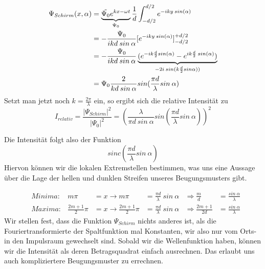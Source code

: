 \documentclass[]{article}
\begin{document}
\begin{align}%
	\Psi_{Schirm}(x,\alpha)&=\underbrace{\Tilde{\Psi_{0}}e^{kx-\omega t}}_{\Psi_{0}}\frac{1}{d}\int_{-d/2}^{d/2} e^{-iky\: sin(\alpha)}  \\ 
	&=-\frac{\Psi_{0}}{ikd \: sin \: \alpha} [e^{-iky \: sin(\alpha)}]^{+d/2}_{-d/2} \\
	&=-\frac{\Psi_{0}}{ikd \: sin \: \alpha} \underbrace{(e^{-ik\frac{d}{2}sin(\alpha)}-e^{ik\frac{d}{2}\:sin(\alpha)})}_{-2i\: sin(k\frac{d}{2}sin \alpha))} \\
	&=\Psi_{0}\frac{2}{kd\: sin \: \alpha}sin(\frac{\pi d}{\lambda}sin \: \alpha) 
\end{align}
Setzt man jetzt noch $k=\frac{2\pi}{\lambda}$ ein, so ergibt sich die relative Intensität zu
\begin{equation}
I_{relativ}=	\frac{|\Psi_{Schirm}|^2}{|\Psi_{0}|^2}=(\frac{\lambda}{\pi d \: sin \: \alpha} sin(\frac{\pi d}{\lambda} sin \: \alpha))^2
\end{equation}

Die Intensität folgt also der Funktion 
\begin{equation}
	sinc(\frac{\pi d}{\lambda} sin \: \alpha)
\end{equation} 
Hiervon können wir die lokalen Extremstellen bestimmen, was uns eine Aussage über die Lage der hellen und dunklen Streifen unseres Beugungsmusters gibt.

\begin{align}
	&Minima: &m\pi&= x \rightarrow m\pi &= \frac{\pi d}{\lambda} \: sin \: \alpha	&\Rightarrow \frac{m}{d} &=\frac{sin \: \alpha}{\lambda}\\
	&Maxima: &\frac{2m+1}{2}\pi&=x \rightarrow \frac{2m+1}{2}\pi &= \frac{\pi d}{\lambda}\:sin \: \alpha &\Rightarrow \frac{2m +1}{2d}&=\frac{sin \: \alpha}{\lambda}
\end{align}
Wir stellen fest, dass die Funktion $\Psi_{Schirm}$ nichts anderes ist, als die Fouriertransformierte der Spaltfunktion mal Konstanten, wir also nur vom Orts- in den Impulsraum gewechselt sind. Sobald wir die Wellenfunktion haben, können wir die Intensität als deren Betragsquadrat einfach ausrechnen. Das erlaubt uns auch kompliziertere Beugungsmuster zu errechnen.
\end{document}
